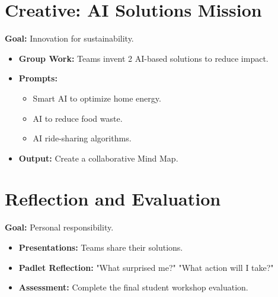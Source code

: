 \documentclass[11pt, a4paper]{article}
\begin{document}
\section{Creative: AI Solutions Mission}
\textbf{Goal:} Innovation for sustainability.
\begin{itemize}
    \item \textbf{Group Work:} Teams invent 2 AI-based solutions to reduce impact.
    \item \textbf{Prompts:}
    \begin{itemize}
        \item Smart AI to optimize home energy.
        \item AI to reduce food waste.
        \item AI ride-sharing algorithms.
    \end{itemize}
    \item \textbf{Output:} Create a collaborative Mind Map.
\end{itemize}

\section{Reflection and Evaluation}
\textbf{Goal:} Personal responsibility.
\begin{itemize}
    \item \textbf{Presentations:} Teams share their solutions.
    \item \textbf{Padlet Reflection:} "What surprised me?" "What action will I take?"
    \item \textbf{Assessment:} Complete the final student workshop evaluation.
\end{itemize}
\end{document}
